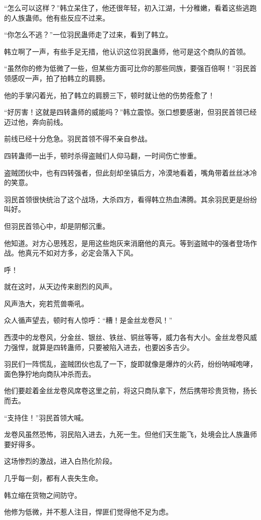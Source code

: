\begin{this_body}
“怎么可以这样？”韩立呆住了，他还很年轻，初入江湖，十分稚嫩，看着这些逃跑的人族蛊师。他有些反应不过来。

“你怎么不逃？”一位羽民蛊师走了过来，看到了韩立。

韩立啊了一声，有些手足无措，他认识这位羽民蛊师，他可是这个商队的首领。

“虽然你的修为低微了一些，但某些方面可比你的那些同族，要强百倍啊！”羽民首领感叹一声，拍了拍韩立的肩膀。

他的手掌闪着光，拍了韩立的肩膀三下，顿时就让他的伤势痊愈了！

“好厉害！这就是四转蛊师的威能吗？”韩立震惊。张口想要感谢，但羽民首领已经迈过他，奔向前线。

前线已经十分危急。羽民首领不得不亲自参战。

四转蛊师一出手，顿时杀得盗贼们人仰马翻，一时间伤亡惨重。

盗贼团伙中，也有四转强者，但此刻却坐镇后方，冷漠地看着，嘴角带着丝丝冰冷的笑意。

羽民首领很快统治了这个战场，大杀四方，看得韩立热血沸腾。其余羽民更是纷纷叫好。

但羽民首领心中，却是阴郁沉重。

他知道。对方心思残忍，是用这些炮灰来消磨他的真元。等到盗贼中的强者登场作战。他真元不如对方多，必定会落入下风。

呼！

就在这时，从天边传来剧烈的风声。

风声浩大，宛若荒兽嘶吼。

众人循声望去，顿时有人惊呼：“糟！是金丝龙卷风！”

西漠中的龙卷风，分金丝、银丝、铁丝、铜丝等等，威力各有大小。金丝龙卷风威力强悍，就算是四转蛊师，只要被陷入进去，也要凶多吉少。

羽民们一阵慌乱，盗贼团伙也乱了一下，旋即就像是爆炸的火药，纷纷呐喊咆哮，面色狰狞地向商队冲杀而去。

他们要趁着金丝龙卷风席卷这里之前，将这只商队拿下，然后携带珍贵货物，扬长而去。

“支持住！”羽民首领大喊。

龙卷风虽然恐怖，羽民陷入进去，九死一生。但他们天生能飞，处境会比人族蛊师要好得多。

这场惨烈的激战，进入白热化阶段。

几乎每一刻，都有人丧失生命。

韩立缩在货物之间防守。

他修为低微，并不惹人注目，悍匪们觉得他不足为虑。


\end{this_body}
